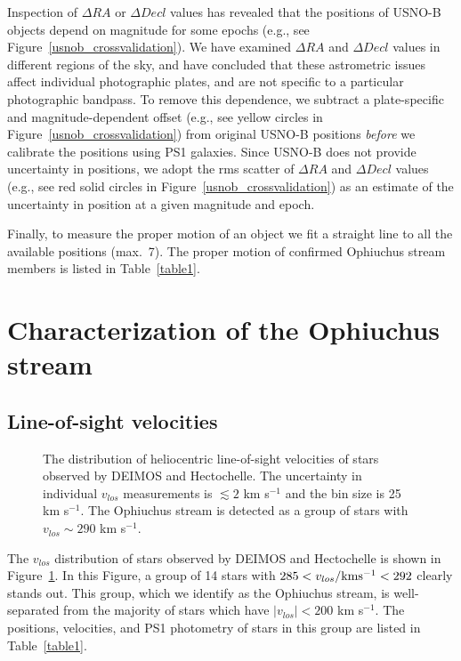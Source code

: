 \documentclass[iop]{emulateapj}
\begin{document}
Inspection of $\Delta RA$ or $\Delta Decl$ values has revealed that the
positions of USNO-B objects depend on magnitude for some epochs (e.g., see
Figure~\ref{usnob_crossvalidation}). We have examined $\Delta RA$ and
$\Delta Decl$ values in different regions of the sky, and have concluded that
these astrometric issues affect individual photographic plates, and are not
specific to a particular photographic bandpass. To remove this dependence, we
subtract a plate-specific and magnitude-dependent offset (e.g., see yellow
circles in Figure~\ref{usnob_crossvalidation}) from original USNO-B positions
{\em before} we calibrate the positions using PS1 galaxies. Since USNO-B does
not provide uncertainty in positions, we adopt the rms scatter of $\Delta RA$
and $\Delta Decl$ values (e.g., see red solid circles in
Figure~\ref{usnob_crossvalidation}) as an estimate of the uncertainty in
position at a given magnitude and epoch.

Finally, to measure the proper motion of an object we fit a straight line to all
the available positions (max.~7). The proper motion of confirmed Ophiuchus
stream members is listed in Table~\ref{table1}.

\section{Characterization of the Ophiuchus stream}\label{results}

\subsection{Line-of-sight velocities\label{vlos}}

\begin{figure}
\caption{
The distribution of heliocentric line-of-sight velocities of stars observed by
DEIMOS and Hectochelle. The uncertainty in individual $v_{los}$ measurements is
$\lesssim2$ km s$^{-1}$ and the bin size is 25 km s$^{-1}$. The Ophiuchus stream
is detected as a group of stars with $v_{los}\sim290$ km s$^{-1}$.
\label{rv_hist}}
\end{figure}

The $v_{los}$ distribution of stars observed by DEIMOS and Hectochelle is shown
in Figure~\ref{rv_hist}. In this Figure, a group of 14 stars with
$285 < v_{los}/ {\rm km s^{-1}} < 292$ clearly stands out. This group, which we
identify as the Ophiuchus stream, is well-separated from the majority of stars
which have $|v_{los}|<200$ km s$^{-1}$. The positions, velocities, and PS1
photometry of stars in this group are listed in Table~\ref{table1}.
\end{document}
